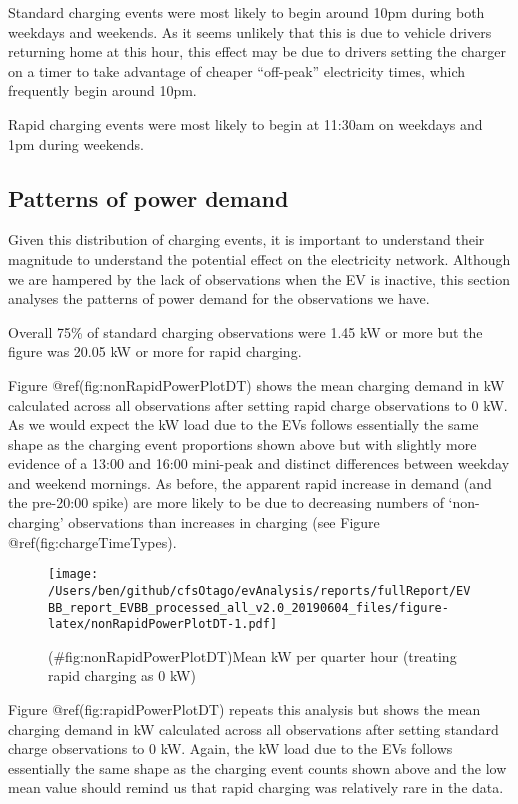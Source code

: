 \documentclass[]{article}
\begin{document}
Standard charging events were most likely to begin around 10pm during both weekdays and weekends. As it seems unlikely that this is due to vehicle drivers returning home at this hour, this effect may be due to drivers setting the charger on a timer to take advantage of cheaper ``off-peak'' electricity times, which frequently begin around 10pm.

Rapid charging events were most likely to begin at 11:30am on weekdays and 1pm during weekends.

\hypertarget{patterns-of-power-demand}{%
\subsection{Patterns of power demand}\label{patterns-of-power-demand}}

Given this distribution of charging events, it is important to understand their magnitude to understand the potential effect on the electricity network. Although we are hampered by the lack of observations when the EV is inactive, this section analyses the patterns of power demand for the observations we have.

Overall 75\% of standard charging observations were 1.45 kW or more but the figure was 20.05 kW or more for rapid charging.

Figure @ref(fig:nonRapidPowerPlotDT) shows the mean charging demand in kW calculated across all observations after setting rapid charge observations to 0 kW. As we would expect the kW load due to the EVs follows essentially the same shape as the charging event proportions shown above but with slightly more evidence of a 13:00 and 16:00 mini-peak and distinct differences between weekday and weekend mornings. As before, the apparent rapid increase in demand (and the pre-20:00 spike) are more likely to be due to decreasing numbers of `non-charging' observations than increases in charging (see Figure @ref(fig:chargeTimeTypes).

\begin{figure}
\centering
\texttt{[image: /Users/ben/github/cfsOtago/evAnalysis/reports/fullReport/EVBB\_report\_EVBB\_processed\_all\_v2.0\_20190604\_files/figure-latex/nonRapidPowerPlotDT-1.pdf]}
\caption{(\#fig:nonRapidPowerPlotDT)Mean kW per quarter hour (treating rapid charging as 0 kW)}
\end{figure}

Figure @ref(fig:rapidPowerPlotDT) repeats this analysis but shows the mean charging demand in kW calculated across all observations after setting standard charge observations to 0 kW. Again, the kW load due to the EVs follows essentially the same shape as the charging event counts shown above and the low mean value should remind us that rapid charging was relatively rare in the data.
\end{document}

